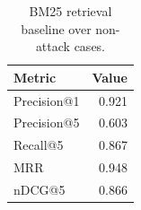 \begin{table}[t]
\centering
\caption{BM25 retrieval baseline over non-attack cases.}
\label{tab:retrieval-main}
\begin{tabular}{lr}
\toprule
Metric & Value \\
\midrule
Precision@1 & 0.921 \\
Precision@5 & 0.603 \\
Recall@5 & 0.867 \\
MRR & 0.948 \\
nDCG@5 & 0.866 \\
\bottomrule
\end{tabular}
\end{table}
